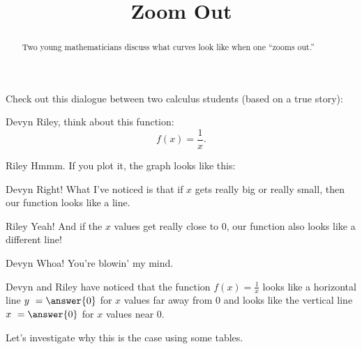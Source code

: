 \documentclass{ximera}
\title[Break-Ground:]{Zoom Out}
\begin{document}
\begin{abstract}
Two young mathematicians discuss what curves look like when one
``zooms out.''
\end{abstract}
\maketitle

Check out this dialogue between two calculus students (based on a true
story):

\begin{dialogue}
\item[Devyn] Riley, think about this function:
  \[
  f(x) = \frac{1}{x}.
  \]
\item[Riley] Hmmm. If you plot it, the graph looks like this:
  \begin{image}
  \end{image}
\item[Devyn] Right! What I've noticed is that if $x$ gets really big or really small, then
  our function looks like a line.
\item[Riley] Yeah!  And if the $x$ values get really close to $0$, our function also looks like a different line! 
\item[Devyn] Whoa!  You're blowin' my mind. 
\end{dialogue}

\begin{problem}
Devyn and Riley have noticed that the function $f(x) = \frac{1}{x}$ looks like a horizontal line $y \ = \answer{0}$ for $x$ values far away from $0$ and looks like the vertical line $x \ = \answer{0}$ for $x$ values near $0$.  
\end{problem}

Let's investigate why this is the case using some tables.
\end{document}
